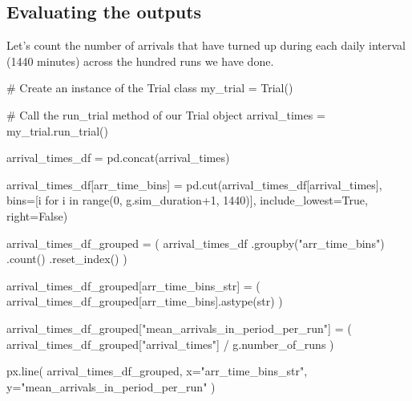 \documentclass[
  letterpaper,
  DIV=11,
  numbers=noendperiod]{scrreprt}
\newenvironment{Shaded}{}{}
\newcommand{\BuiltInTok}[1]{\textcolor[rgb]{0.84,0.23,0.29}{#1}}
\newcommand{\CommentTok}[1]{\textcolor[rgb]{0.42,0.45,0.49}{#1}}
\newcommand{\ControlFlowTok}[1]{\textcolor[rgb]{0.84,0.23,0.29}{#1}}
\newcommand{\DecValTok}[1]{\textcolor[rgb]{0.00,0.36,0.77}{#1}}
\newcommand{\KeywordTok}[1]{\textcolor[rgb]{0.84,0.23,0.29}{#1}}
\newcommand{\NormalTok}[1]{\textcolor[rgb]{0.14,0.16,0.18}{#1}}
\newcommand{\OperatorTok}[1]{\textcolor[rgb]{0.14,0.16,0.18}{#1}}
\newcommand{\StringTok}[1]{\textcolor[rgb]{0.01,0.18,0.38}{#1}}
\newcommand{\VariableTok}[1]{\textcolor[rgb]{0.89,0.38,0.04}{#1}}
\begin{document}
\subsection{Evaluating the outputs}\label{evaluating-the-outputs-6}

Let's count the number of arrivals that have turned up during each daily
interval (1440 minutes) across the hundred runs we have done.

\begin{Shaded}
\begin{Highlighting}[]
\CommentTok{\# Create an instance of the Trial class}
\NormalTok{my\_trial }\OperatorTok{=}\NormalTok{ Trial()}

\CommentTok{\# Call the run\_trial method of our Trial object}
\NormalTok{arrival\_times }\OperatorTok{=}\NormalTok{ my\_trial.run\_trial()}

\NormalTok{arrival\_times\_df }\OperatorTok{=}\NormalTok{ pd.concat(arrival\_times)}

\NormalTok{arrival\_times\_df[}\StringTok{\textquotesingle{}arr\_time\_bins\textquotesingle{}}\NormalTok{] }\OperatorTok{=}\NormalTok{ pd.cut(arrival\_times\_df[}\StringTok{\textquotesingle{}arrival\_times\textquotesingle{}}\NormalTok{], bins}\OperatorTok{=}\NormalTok{[i }\ControlFlowTok{for}\NormalTok{ i }\KeywordTok{in} \BuiltInTok{range}\NormalTok{(}\DecValTok{0}\NormalTok{, g.sim\_duration}\OperatorTok{+}\DecValTok{1}\NormalTok{, }\DecValTok{1440}\NormalTok{)], include\_lowest}\OperatorTok{=}\VariableTok{True}\NormalTok{, right}\OperatorTok{=}\VariableTok{False}\NormalTok{)}

\NormalTok{arrival\_times\_df\_grouped }\OperatorTok{=}\NormalTok{ (}
\NormalTok{  arrival\_times\_df}
\NormalTok{  .groupby(}\StringTok{"arr\_time\_bins"}\NormalTok{)}
\NormalTok{  .count()}
\NormalTok{  .reset\_index()}
\NormalTok{)}
\end{Highlighting}
\end{Shaded}

\begin{Shaded}
\begin{Highlighting}[]
\NormalTok{arrival\_times\_df\_grouped[}\StringTok{\textquotesingle{}arr\_time\_bins\_str\textquotesingle{}}\NormalTok{] }\OperatorTok{=}\NormalTok{ (}
\NormalTok{  arrival\_times\_df\_grouped[}\StringTok{\textquotesingle{}arr\_time\_bins\textquotesingle{}}\NormalTok{].astype(}\StringTok{\textquotesingle{}str\textquotesingle{}}\NormalTok{)}
\NormalTok{)}

\NormalTok{arrival\_times\_df\_grouped[}\StringTok{"mean\_arrivals\_in\_period\_per\_run"}\NormalTok{] }\OperatorTok{=}\NormalTok{ (}
\NormalTok{  arrival\_times\_df\_grouped[}\StringTok{"arrival\_times"}\NormalTok{] }\OperatorTok{/}\NormalTok{ g.number\_of\_runs}
\NormalTok{)}

\NormalTok{px.line(}
\NormalTok{  arrival\_times\_df\_grouped,}
\NormalTok{  x}\OperatorTok{=}\StringTok{"arr\_time\_bins\_str"}\NormalTok{,}
\NormalTok{  y}\OperatorTok{=}\StringTok{"mean\_arrivals\_in\_period\_per\_run"}
\NormalTok{)}
\end{Highlighting}
\end{Shaded}
\end{document}
